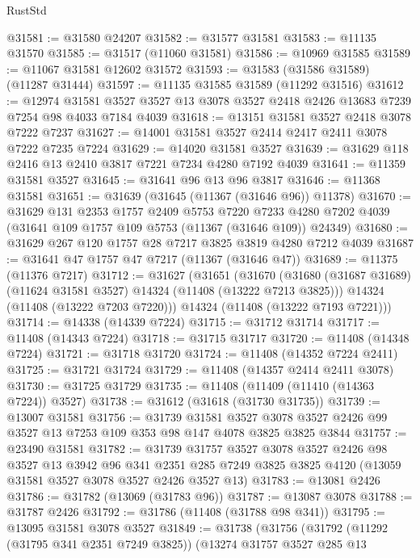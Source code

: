 \begin{lexlean}{RustStd}
\begin{coremodule}
@31581 := @31580 @24207
@31582 := @31577 @31581
@31583 := @11135 @31570
@31585 := @31517 (@11060 @31581)
@31586 := @10969 @31585
@31589 := @11067 @31581 @12602 @31572
@31593 := @31583 (@31586 @31589) (@11287 @31444)
@31597 := @11135 @31585 @31589 (@11292 @31516)
@31612 := @12974
    @31581
    @3527
    @3527
    @13
    @3078
    @3527
    @2418
    @2426
    @13683
    @7239
    @7254
    @98
    @4033
    @7184
    @4039
@31618 := @13151 @31581 @3527 @2418 @3078 @7222 @7237
@31627 := @14001 @31581 @3527 @2414 @2417 @2411 @3078 @7222 @7235 @7224
@31629 := @14020 @31581 @3527
@31639 := @31629 @118 @2416 @13 @2410 @3817 @7221 @7234 @4280 @7192 @4039
@31641 := @11359 @31581 @3527
@31645 := @31641 @96 @13 @96 @3817
@31646 := @11368 @31581
@31651 := @31639 (@31645 (@11367 (@31646 @96)) @11378)
@31670 := @31629
    @131
    @2353
    @1757
    @2409
    @5753
    @7220
    @7233
    @4280
    @7202
    @4039
    (@31641 @109 @1757 @109 @5753 (@11367 (@31646 @109)) @24349)
@31680 := @31629 @267 @120 @1757 @28 @7217 @3825 @3819 @4280 @7212 @4039
@31687 := @31641 @47 @1757 @47 @7217 (@11367 (@31646 @47))
@31689 := @11375 (@11376 @7217)
@31712 := @31627
    (@31651
      (@31670
        (@31680 (@31687 @31689) (@11624 @31581 @3527) @14324 (@11408 (@13222 @7213 @3825)))
        @14324
        (@11408 (@13222 @7203 @7220)))
      @14324
      (@11408 (@13222 @7193 @7221)))
@31714 := @14338 (@14339 @7224)
@31715 := @31712 @31714
@31717 := @11408 (@14343 @7224)
@31718 := @31715 @31717
@31720 := @11408 (@14348 @7224)
@31721 := @31718 @31720
@31724 := @11408 (@14352 @7224 @2411)
@31725 := @31721 @31724
@31729 := @11408 (@14357 @2414 @2411 @3078)
@31730 := @31725 @31729
@31735 := @11408 (@11409 (@11410 (@14363 @7224)) @3527)
@31738 := @31612 (@31618 (@31730 @31735))
@31739 := @13007 @31581
@31756 := @31739
    @31581
    @3527
    @3078
    @3527
    @2426
    @99
    @3527
    @13
    @7253
    @109
    @353
    @98
    @147
    @4078
    @3825
    @3825
    @3844
@31757 := @23490 @31581
@31782 := @31739
    @31757
    @3527
    @3078
    @3527
    @2426
    @98
    @3527
    @13
    @3942
    @96
    @341
    @2351
    @285
    @7249
    @3825
    @3825
    @4120
    (@13059 @31581 @3527 @3078 @3527 @2426 @3527 @13)
@31783 := @13081 @2426
@31786 := @31782 (@13069 (@31783 @96))
@31787 := @13087 @3078
@31788 := @31787 @2426
@31792 := @31786 (@11408 (@31788 @98 @341))
@31795 := @13095 @31581 @3078 @3527
@31849 := @31738
    (@31756
      (@31792
        (@11292 (@31795 @341 @2351 @7249 @3825))
        (@13274
          @31757
          @3527
          @285
          @13

\end{coremodule}
\end{lexlean}
